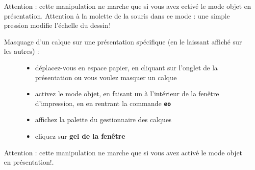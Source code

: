\documentclass[a4paper,12pt,french]{sphinxmanual}
\begin{document}
Attention : cette manipulation ne marche que si vous avez ectivé le mode objet en présentation. Attention à la molette de la souris dans ce mode : une simple pression modifie l'échelle du dessin!
\begin{description}
\item[{Masquage d'un calque sur une présentation spécifique (en le laissant affiché sur les autres) :}] \leavevmode\begin{itemize}
\item {} 
déplacez-vous en espace papier, en cliquant sur l'onglet de la présentation ou vous voulez masquer un calque

\item {} 
activez le mode objet, en faisant un  à l'intérieur de la fenêtre d'impression, en en rentrant la commande \textbf{\texttt{eo}}

\item {} 
affichez la palette du gestionnaire des calques

\item {} 
cliquez sur \textbf{gel de la fenêtre}

\end{itemize}

\end{description}
\begin{figure}[htbp]
\centering

\noindent{}
\end{figure}
\begin{figure}[htbp]
\centering

\noindent{}
\end{figure}
\begin{figure}[htbp]
\centering

\noindent{}
\end{figure}
\begin{figure}[htbp]
\centering

\noindent{}
\end{figure}

Attention : cette manipulation ne marche que si vous avez activé le mode objet en présentation!.
\end{document}

